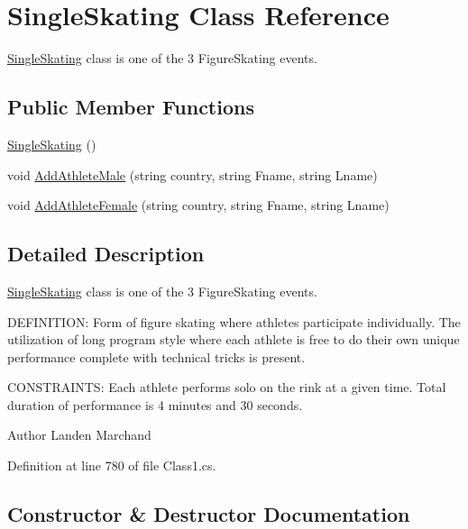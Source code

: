 \hypertarget{classSingleSkating}{}\section{Single\+Skating Class Reference}
\label{classSingleSkating}


\hyperlink{classSingleSkating}{Single\+Skating} class is one of the 3 Figure\+Skating events.  


\subsection*{Public Member Functions}
\begin{DoxyCompactItemize}
\item 
\hyperlink{classSingleSkating_af9d28072daf32072d6169079cfeb6d68}{Single\+Skating} ()
\item 
void \hyperlink{classSingleSkating_a5af177900da74048cda071514a38339b}{Add\+Athlete\+Male} (string country, string Fname, string Lname)
\item 
void \hyperlink{classSingleSkating_a8b0ede01071b657b05037ccccc114ffe}{Add\+Athlete\+Female} (string country, string Fname, string Lname)
\end{DoxyCompactItemize}


\subsection{Detailed Description}
\hyperlink{classSingleSkating}{Single\+Skating} class is one of the 3 Figure\+Skating events. 

D\+E\+F\+I\+N\+I\+T\+I\+ON\+: Form of figure skating where athletes participate individually. The utilization of long program style where each athlete is free to do their own unique performance complete with technical tricks is present.

C\+O\+N\+S\+T\+R\+A\+I\+N\+TS\+: Each athlete performs solo on the rink at a given time. Total duration of performance is 4 minutes and 30 seconds.\begin{DoxyAuthor}{Author}
Landen Marchand 
\end{DoxyAuthor}


Definition at line 780 of file Class1.\+cs.



\subsection{Constructor \& Destructor Documentation}
\mbox{\label{classSingleSkating_af9d28072daf32072d6169079cfeb6d68}} 
